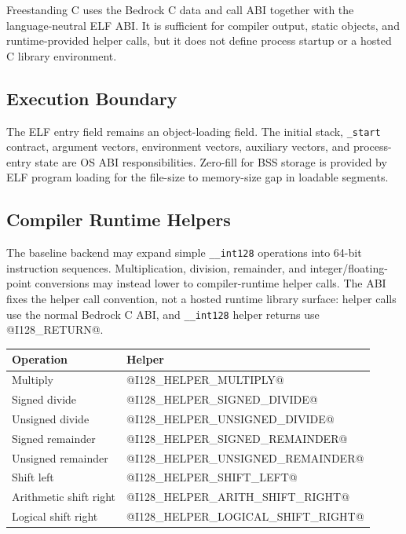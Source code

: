 Freestanding C uses the Bedrock C data and call ABI together with the
language-neutral ELF ABI. It is sufficient for compiler output, static objects,
and runtime-provided helper calls, but it does not define process startup or a
hosted C library environment.

\subsection{Execution Boundary}
The ELF entry field remains an object-loading field. The initial stack,
\texttt{\_start} contract, argument vectors, environment vectors, auxiliary
vectors, and process-entry state are OS ABI responsibilities. Zero-fill for BSS
storage is provided by ELF program loading for the file-size to memory-size gap
in loadable segments.

\subsection{Compiler Runtime Helpers}
The baseline backend may expand simple \texttt{\_\_int128} operations into
64-bit instruction sequences. Multiplication, division, remainder, and
integer/floating-point conversions may instead lower to compiler-runtime helper
calls. The ABI fixes the helper call convention, not a hosted runtime library
surface: helper calls use the normal Bedrock C ABI, and \texttt{\_\_int128}
helper returns use @I128_RETURN@.

\begingroup\footnotesize
\setlength{\tabcolsep}{2pt}
\begin{longtable}{@{}p{2.25in}p{3.25in}@{}}
\toprule
\textbf{Operation} & \textbf{Helper}\\
\midrule
\endhead
Multiply & @I128_HELPER_MULTIPLY@\\
Signed divide & @I128_HELPER_SIGNED_DIVIDE@\\
Unsigned divide & @I128_HELPER_UNSIGNED_DIVIDE@\\
Signed remainder & @I128_HELPER_SIGNED_REMAINDER@\\
Unsigned remainder & @I128_HELPER_UNSIGNED_REMAINDER@\\
Shift left & @I128_HELPER_SHIFT_LEFT@\\
Arithmetic shift right & @I128_HELPER_ARITH_SHIFT_RIGHT@\\
Logical shift right & @I128_HELPER_LOGICAL_SHIFT_RIGHT@\\
\bottomrule
\end{longtable}
\endgroup

